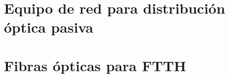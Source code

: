  \section{Equipo de red para distribución óptica pasiva}
 \resetallcounters
 
 \clearpage

 \section{Fibras ópticas para FTTH}
 \resetallcounters
 
 \clearpage

